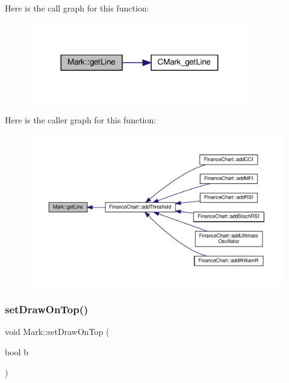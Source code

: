 Here is the call graph for this function\+:
\nopagebreak
\begin{figure}[H]
\begin{center}
\leavevmode
\includegraphics[width=275pt]{class_mark_a7e623a0eef4340850fd13605f95b65d4_cgraph}
\end{center}
\end{figure}
Here is the caller graph for this function\+:
\nopagebreak
\begin{figure}[H]
\begin{center}
\leavevmode
\includegraphics[width=350pt]{class_mark_a7e623a0eef4340850fd13605f95b65d4_icgraph}
\end{center}
\end{figure}
\mbox{\label{class_mark_a2d599567c3fa6109d6d8c75625fb251b}} 
\subsubsection{\texorpdfstring{set\+Draw\+On\+Top()}{setDrawOnTop()}}
{\footnotesize\ttfamily void Mark\+::set\+Draw\+On\+Top (\begin{DoxyParamCaption}\item[{bool}]{b }\end{DoxyParamCaption})\hspace{0.3cm}{\ttfamily [inline]}}




